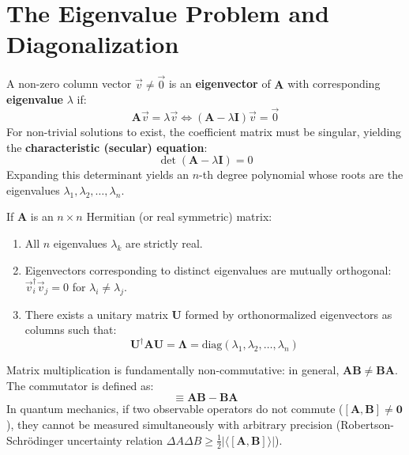 \section{The Eigenvalue Problem and Diagonalization}
\begin{mathdefinition}
A non-zero column vector $\vec{v} \neq \vec{0}$ is an \textbf{eigenvector} of $\mathbf{A}$ with corresponding \textbf{eigenvalue} $\lambda$ if:
\begin{equation}
\mathbf{A}\vec{v} = \lambda\vec{v} \iff (\mathbf{A} - \lambda\mathbf{I})\vec{v} = \vec{0}
\end{equation}
For non-trivial solutions to exist, the coefficient matrix must be singular, yielding the \textbf{characteristic (secular) equation}:
\begin{equation}
\det(\mathbf{A} - \lambda\mathbf{I}) = 0
\end{equation}
Expanding this determinant yields an $n$-th degree polynomial whose roots are the eigenvalues $\lambda_1, \lambda_2, \dots, \lambda_n$.
\end{mathdefinition}

\begin{maththeorem}
If $\mathbf{A}$ is an $n \times n$ Hermitian (or real symmetric) matrix:
\begin{enumerate}
    \item All $n$ eigenvalues $\lambda_k$ are strictly real.
    \item Eigenvectors corresponding to distinct eigenvalues are mutually orthogonal: $\vec{v}_i^\dagger \vec{v}_j = 0$ for $\lambda_i \neq \lambda_j$.
    \item There exists a unitary matrix $\mathbf{U}$ formed by orthonormalized eigenvectors as columns such that:
    \begin{equation}
    \mathbf{U}^\dagger \mathbf{A} \mathbf{U} = \mathbf{\Lambda} = \text{diag}(\lambda_1, \lambda_2, \dots, \lambda_n)
    \end{equation}
\end{enumerate}
\end{maththeorem}

\begin{pitfallbox}
Matrix multiplication is fundamentally non-commutative: in general, $\mathbf{A}\mathbf{B} \neq \mathbf{B}\mathbf{A}$.
The commutator is defined as:
\begin{equation}
[\mathbf{A}, \mathbf{B}] \equiv \mathbf{A}\mathbf{B} - \mathbf{B}\mathbf{A}
\end{equation}
In quantum mechanics, if two observable operators do not commute ($[\mathbf{A}, \mathbf{B}] \neq \mathbf{0}$), they cannot be measured simultaneously with arbitrary precision (Robertson-Schrödinger uncertainty relation $\Delta A \Delta B \ge \frac{1}{2}|\langle [\mathbf{A}, \mathbf{B}] \rangle|$).
\end{pitfallbox}


